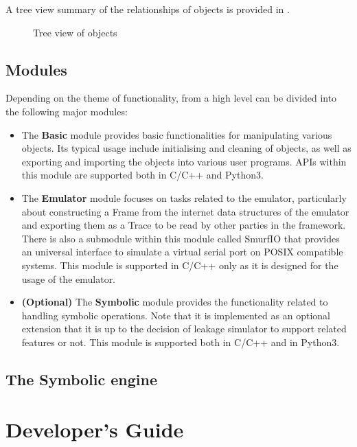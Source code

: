 \documentclass[]{report}
\begin{document}
A tree view summary of the relationships of \smurf objects is provided in .
\begin{figure}
	\caption{Tree view of \smurf objects\label{fig:SmurfTreeview}}
\end{figure}

\section{\smurf Modules}
Depending on the theme of functionality, from a high level \smurf can be divided into the following major modules:
\begin{itemize}
	\item The \smurf \textbf{Basic} module provides basic functionalities for manipulating various \smurf objects. Its typical usage include initialising and cleaning of \smurf objects, as well as exporting and importing the \smurf objects into various user programs. APIs within this module are supported both in C/C++ and Python3. 
	
	\item The \smurf \textbf{Emulator} module focuses on tasks related to the emulator, particularly about constructing a \smurf Frame from the internet data structures of the emulator and exporting them as a \smurf Trace to be read by other parties in the \smurf framework. There is also a submodule within this module called SmurfIO that provides an universal interface to simulate a virtual serial port on POSIX compatible systems. This module is supported in C/C++ only as it is designed for the usage of the emulator.
	
	\item \textbf{(Optional)} The \smurf \textbf{Symbolic} module  provides the functionality related to handling symbolic operations. Note that it is implemented as an optional extension that it is up to the decision of leakage simulator to support related features or not. This module is supported both in C/C++ and in Python3.
\end{itemize}





\section{The \smurf Symbolic engine\label{sec:UserGuideSym}}

\chapter{Developer's Guide}

\printbibliography
\end{document}
